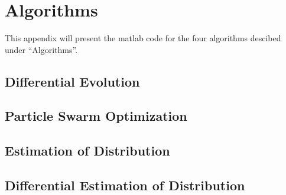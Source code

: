 \section{Algorithms}
\label{appendix:algorithms}

This appendix will present the matlab code for the four algorithms descibed under ``Algorithms''.

\subsection{Differential Evolution}



\subsection{Particle Swarm Optimization}



\subsection{Estimation of Distribution}



\subsection{Differential Estimation of Distribution}


